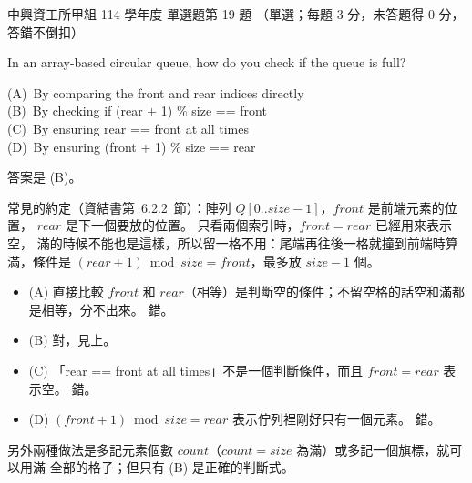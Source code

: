 \begin{pastexam}[label={px:nchu-114-dsa-19}]{中興資工所甲組 114 學年度 單選題第 19 題}
（單選；每題 3 分，未答題得 0 分，答錯不倒扣）

In an array-based circular queue, how do you check if the queue is full?

(A)~By comparing the front and rear indices directly\\
(B)~By checking if (rear + 1) \% size == front\\
(C)~By ensuring rear == front at all times\\
(D)~By ensuring (front + 1) \% size == rear
\end{pastexam}

\begin{pastsoln}
答案是 (B)。

常見的約定（資結書第~6.2.2~節）：陣列 $Q[0..\mathit{size} - 1]$，$\mathit{front}$ 是前端元素的位置，
$\mathit{rear}$ 是下一個要放的位置。 只看兩個索引時，$\mathit{front} = \mathit{rear}$ 已經用來表示空，
滿的時候不能也是這樣，所以留一格不用：尾端再往後一格就撞到前端時算滿，條件是
$(\mathit{rear} + 1) \bmod \mathit{size} = \mathit{front}$，最多放 $\mathit{size} - 1$ 個。
\begin{itemize}
\item (A) 直接比較 $\mathit{front}$ 和 $\mathit{rear}$（相等）是判斷空的條件；不留空格的話空和滿都是相等，分不出來。 錯。
\item (B) 對，見上。
\item (C) 「rear == front at all times」不是一個判斷條件，而且 $\mathit{front} = \mathit{rear}$ 表示空。 錯。
\item (D) $(\mathit{front} + 1) \bmod \mathit{size} = \mathit{rear}$ 表示佇列裡剛好只有一個元素。 錯。
\end{itemize}
另外兩種做法是多記元素個數 $\mathit{count}$（$\mathit{count} = \mathit{size}$ 為滿）或多記一個旗標，就可以用滿
全部的格子；但只有 (B) 是正確的判斷式。
\end{pastsoln}
